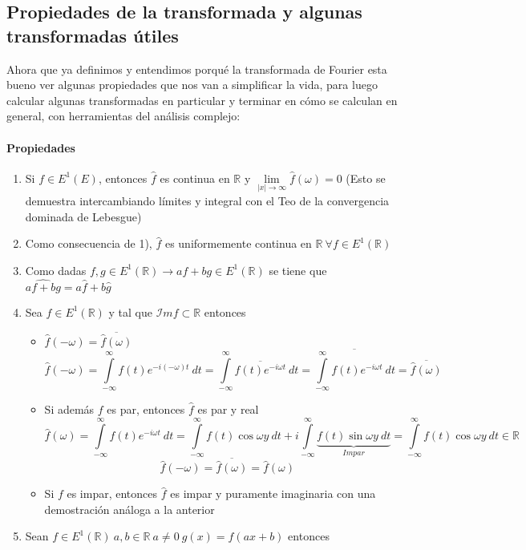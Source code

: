 \documentclass[a4paper,spanish]{article}
\def\Ima {\mathcal{I}m}
\def\R {\mathbb{R}}
\numberwithin{equation}{section}
\begin{document}
\subsection{Propiedades de la transformada y algunas transformadas \'utiles}

Ahora que ya definimos y entendimos porqu\'e la transformada de Fourier esta bueno ver algunas propiedades que nos van a simplificar la vida, para luego calcular algunas transformadas en particular y terminar en c\'omo se calculan en general, con herramientas del an\'alisis complejo:

\paragraph{Propiedades}

\begin{enumerate}
\item Si $f \in E^1(E)$, entonces $\widehat{f}$ es continua en $\R$ y $\lim\limits_{\vert{x}\vert \rightarrow \infty}{\widehat{f}(\omega)=0}$ (Esto se demuestra intercambiando l\'imites y integral con el Teo de la convergencia dominada de Lebesgue)
\item Como consecuencia de 1), $\widehat{f}$ es uniformemente continua en $\R \ \forall f \in E^1(\R)$
\item Como dadas $f,g \in E^1(\R) \rightarrow af+bg \in E^1(\R)$ se tiene que $\widehat{af+bg}=a\widehat{f} + b \widehat{g}$
\item Sea $f \in E^1(\R)$ y tal que $\Ima f \subset \R$ entonces
\begin{itemize}
\item $\widehat{f}(-\omega)=\overline{\widehat{f}(\omega)}$
\\
\[\widehat{f}(-\omega)= \int \limits_{-\infty}^{\infty}{f(t)e^{-i(-\omega) t}} \ dt = \int \limits_{-\infty}^{\infty}\overline{{f(t)e^{-i\omega t}}} \ dt = \overline{\int \limits_{-\infty}^{\infty}{f(t)e^{-i\omega t}} \ dt} = \overline{\widehat{f}(\omega)} \]
\item Si adem\'as $f$ es par, entonces $\widehat{f}$ es par y real
\\
\[
\widehat{f}(\omega)= \int \limits_{-\infty}^{\infty}{f(t)e^{-i\omega t}} \ dt = \int \limits_{-\infty}^{\infty}{f(t)\cos{\omega y}} \ dt + i \int \limits_{-\infty}^{\infty}\underbrace{{f(t)\sin{\omega y}}\ dt}_{Impar} = \int \limits_{-\infty}^{\infty}{f(t)\cos{\omega y}} \ dt  \in \R   
\]
\[\widehat{f}(-\omega)=\overline{\widehat{f}(\omega)} = \widehat{f}(\omega)\]
\item Si $f$ es impar, entonces $\widehat{f}$ es impar y puramente imaginaria con una demostraci\'on an\'aloga a la anterior
\end{itemize}
\item Sean $f \in E^1(\R) \ a,b \in \R \ a \neq 0 \ g(x)=f(ax+b)$ entonces


\end{enumerate}
\end{document}
